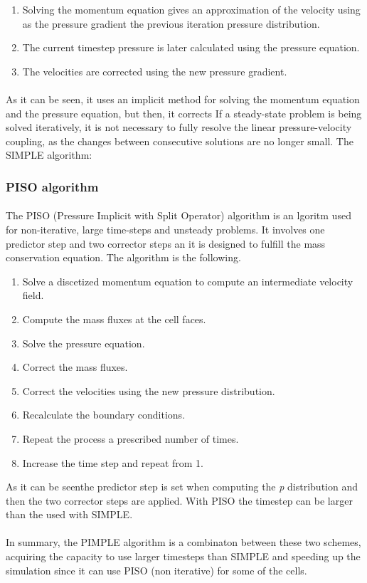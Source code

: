 \begin{enumerate}
\item Solving the momentum equation gives an approximation of the velocity using as the pressure gradient the previous iteration pressure distribution.
\item The current timestep pressure is later calculated using the pressure equation. 
\item The velocities are corrected using the new pressure gradient.
\end{enumerate}

\paragraph{}As it can be seen, it uses an implicit method for solving the momentum equation and the pressure equation, but then, it corrects 
If a steady-state problem is being solved iteratively, it is not necessary to fully resolve the linear pressure-velocity coupling, as the changes between consecutive solutions are no longer small. The SIMPLE algorithm:

\subsubsection{PISO algorithm}

\paragraph{}The PISO (Pressure Implicit with Split Operator) algorithm is an lgoritm used for non-iterative, large time-steps and unsteady problems. It involves one predictor step and two corrector steps an it is designed to fulfill the mass conservation equation. The algorithm is the following.

\begin{enumerate}
\item Solve a discetized momentum equation to compute an intermediate velocity field.
\item Compute the mass fluxes at the cell faces.
\item Solve the pressure equation.
\item Correct the mass fluxes.
\item Correct the velocities using the new pressure distribution.
\item Recalculate the boundary conditions.
\item Repeat the process a prescribed number of times.
\item Increase the time step and repeat from 1.
\end{enumerate}

As it can be seenthe predictor step is set when computing the \textit{p} distribution and then the two corrector steps are applied. With PISO the timestep can be larger than the used with SIMPLE.

\paragraph{}In summary, the PIMPLE algorithm is a combinaton between these two schemes, acquiring the capacity to use larger timesteps than SIMPLE and speeding up the simulation since it can use PISO (non iterative) for some of the cells.